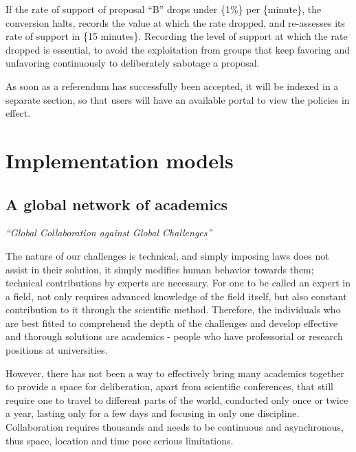 \documentclass[a4paper,11pt]{article}
\begin{document}
\begin{multicols}{2}
If the rate of support of proposal “B” drops under \{1\%\} per \{minute\}, the conversion halts, records the value at which the rate dropped, and re-assesses its rate of support in \{15 minutes\}. Recording the level of support at which the rate dropped is essential, to avoid the exploitation from groups that keep favoring and unfavoring continuously to deliberately sabotage a proposal.

As soon as a referendum has successfully been accepted, it will be indexed in a separate section, so that users will have an available portal to view the policies in effect.

\section{Implementation models} \label{implementation}

\subsection{A global network of academics} \label{academics}

\textit{``Global​ ​Collaboration​ ​against​ ​Global​ ​Challenges''} \\


The nature of our challenges is technical, and simply imposing laws does not assist in their solution, it simply modifies human behavior towards them; technical contributions by experts are necessary. For one to be called an expert in a field, not only requires advanced knowledge of the field itself, but also constant contribution to it through the scientific method. Therefore, the individuals who are best fitted to comprehend the depth of the challenges and develop effective and thorough solutions are academics - people who have professorial or research positions at universities.

However, there has not been a way to effectively bring many academics together to provide a space for deliberation, apart from scientific conferences, that still require one to travel to different parts of the world, conducted only once or twice a year, lasting only for a few days and focusing in only one discipline. Collaboration requires thousands and needs to be continuous and asynchronous, thus space, location and time pose serious limitations.


\end{multicols}
\end{document}
